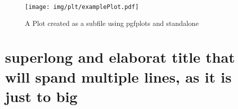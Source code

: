 \documentclass[todos=off]{HsH-report}
\begin{document}
		\begin{figure}
			\texttt{[image: img/plt/examplePlot.pdf]}
			\caption{A Plot created as a subfile using pgfplots and standalone}
		\end{figure}

	\section{superlong and elaborat title that will spand multiple lines, as it is just to big}
		\lipsum[12-13]
		\smallskip

		\lipsum[12-13]


		\lipsum[12-13]

	\listoffigures
	\listoftables
\end{document}
